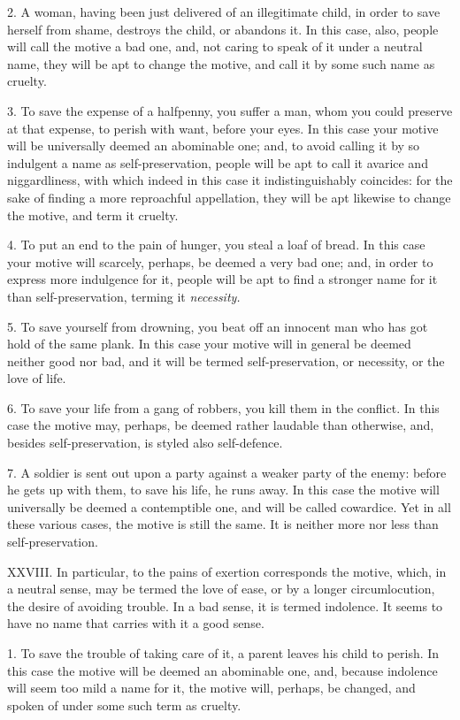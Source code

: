 \documentclass[12pt]{report}
\begin{document}
2. A woman, having been just delivered of an illegitimate child, in
order to save herself from shame, destroys the child, or abandons it. In
this case, also, people will call the motive a bad one, and, not caring
to speak of it under a neutral name, they will be apt to change the
motive, and call it by some such name as cruelty.

3. To save the expense of a halfpenny, you suffer a man, whom you could
preserve at that expense, to perish with want, before your eyes. In this
case your motive will be universally deemed an abominable one; and, to
avoid calling it by so indulgent a name as self-preservation, people
will be apt to call it avarice and niggardliness, with which indeed in
this case it indistinguishably coincides: for the sake of finding a more
reproachful appellation, they will be apt likewise to change the motive,
and term it cruelty.

4. To put an end to the pain of hunger, you steal a loaf of bread. In
this case your motive will scarcely, perhaps, be deemed a very bad one;
and, in order to express more indulgence for it, people will be apt to
find a stronger name for it than self-preservation, terming it
\emph{necessity.}

5. To save yourself from drowning, you beat off an innocent man who has
got hold of the same plank. In this case your motive will in general be
deemed neither good nor bad, and it will be termed self-preservation, or
necessity, or the love of life.

6. To save your life from a gang of robbers, you kill them in the
conflict. In this case the motive may, perhaps, be deemed rather
laudable than otherwise, and, besides self-preservation, is styled also
self-defence.

7. A soldier is sent out upon a party against a weaker party of the
enemy: before he gets up with them, to save his life, he runs away. In
this case the motive will universally be deemed a contemptible one, and
will be called cowardice. Yet in all these various cases, the motive is
still the same. It is neither more nor less than self-preservation.

XXVIII. In particular, to the pains of exertion corresponds the motive,
which, in a neutral sense, may be termed the love of ease, or by a
longer circumlocution, the desire of avoiding trouble. In a bad sense,
it is termed indolence. It seems to have no name that carries with it a
good sense.

1. To save the trouble of taking care of it, a parent leaves his child
to perish. In this case the motive will be deemed an abominable one,
and, because indolence will seem too mild a name for it, the motive
will, perhaps, be changed, and spoken of under some such term as
cruelty.
\end{document}
